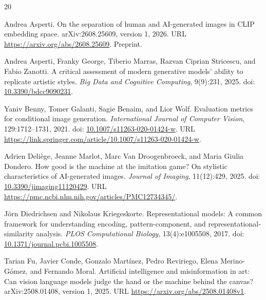 \documentclass[11pt,a4paper]{article}
\begin{document}
\begingroup
\small
\setlength{\bibsep}{5pt}
\begin{thebibliography}{20}
Andrea Asperti.
On the separation of human and AI-generated images in CLIP embedding space.
arXiv:2608.25609, version 1, 2026.
URL \url{https://arxiv.org/abs/2608.25609}. Preprint.

Andrea Asperti, Franky George, Tiberio Marras, Razvan Ciprian Stricescu, and Fabio Zanotti.
A critical assessment of modern generative models' ability to replicate artistic styles.
\textit{Big Data and Cognitive Computing}, 9(9):231, 2025.
doi: \href{https://doi.org/10.3390/bdcc9090231}{10.3390/bdcc9090231}.

Yaniv Benny, Tomer Galanti, Sagie Benaim, and Lior Wolf.
Evaluation metrics for conditional image generation.
\textit{International Journal of Computer Vision}, 129:1712--1731, 2021.
doi: \href{https://doi.org/10.1007/s11263-020-01424-w}{10.1007/s11263-020-01424-w}.
URL \url{https://link.springer.com/article/10.1007/s11263-020-01424-w}.

Adrien Deliège, Jeanne Marlot, Marc Van Droogenbroeck, and Maria Giulia Dondero.
How good is the machine at the imitation game? On stylistic characteristics of AI-generated images.
\textit{Journal of Imaging}, 11(12):429, 2025.
doi: \href{https://doi.org/10.3390/jimaging11120429}{10.3390/jimaging11120429}.
URL \url{https://pmc.ncbi.nlm.nih.gov/articles/PMC12734345/}.

Jörn Diedrichsen and Nikolaus Kriegeskorte.
Representational models: A common framework for understanding encoding, pattern-component, and representational-similarity analysis.
\textit{PLOS Computational Biology}, 13(4):e1005508, 2017.
doi: \href{https://doi.org/10.1371/journal.pcbi.1005508}{10.1371/journal.pcbi.1005508}.

Tarian Fu, Javier Conde, Gonzalo Martínez, Pedro Reviriego, Elena Merino-Gómez, and Fernando Moral.
Artificial intelligence and misinformation in art: Can vision language models judge the hand or the machine behind the canvas?
arXiv:2508.01408, version 1, 2025.
URL \url{https://arxiv.org/abs/2508.01408v1}.


\end{thebibliography}
\end{document}
